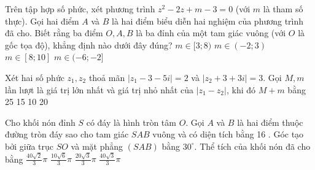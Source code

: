 \begin{ex} 
 Trên tập hợp số phức, xét phương trình $z^{2}-2 z+m-3=0$ (với $m$ là tham số thực). Gọi hai điểm $A$ và $B$ là hai điểm biểu diễn hai nghiệm của phương trình đã cho. Biết rằng ba điểm $O, A, B$ là ba đỉnh của một tam giác vuông (với $O$ là gốc tọa độ), khẳng định nào dưới đây đúng?
\choice 
 { $m \in[3 ; 8)$} 
 { $m \in(-2 ; 3)$} 
 { $m \in[8 ; 10]$} 
 { $m \in(-6 ;-2]$}
\end{ex} 
 
\begin{ex} 
 Xét hai số phức $z_{1}, z_{2}$ thoả mãn $\left|z_{1}-3-5 i\right|=2$ và $\left|z_{2}+3+3 i\right|=3$. Gọi $M, m$ lần lượt là giá trị lớn nhất và giá trị nhỏ nhất của $\left|z_{1}-z_{2}\right|$, khi đó $M+m$ bằng
\choice 
 { 25 } 
 { 15 } 
 { 10 } 
 { 20 }
\end{ex} 
 
\begin{ex} 
 Cho khối nón đỉnh $S$ có đáy là hình tròn tâm $O$. Gọi $A$ và $B$ là hai điểm thuộc đường tròn đáy sao cho tam giác $S A B$ vuông và có diện tích bằng 16 . Góc tạo bởi giữa trục $S O$ và mặt phẳng $(S A B)$ bằng $30^{\circ}$. Thể tích của khối nón đã cho bằng
 \choice
{ $\frac{40 \sqrt{2}}{3} \pi$} 
 { $\frac{10 \sqrt{6}}{3} \pi$} 
 { $\frac{20 \sqrt{3}}{3} \pi$}
 { $\frac{40 \sqrt{3}}{3} \pi$}
\end{ex} 
 
